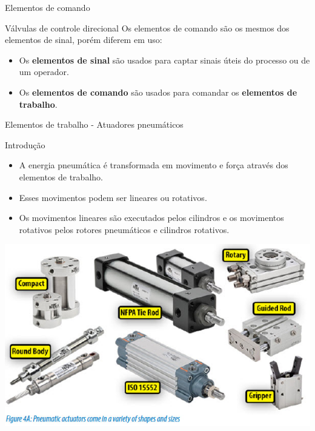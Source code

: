 \begin{frame}{Elementos de comando}
	\begin{block}{Válvulas de controle direcional}
		Os elementos de comando são os mesmos dos elementos de sinal, porém diferem em uso:
		\begin{itemize}
			\item Os \textbf{elementos de sinal} são usados para captar sinais úteis do processo ou de um operador.
			\item Os \textbf{elementos de comando} são usados para comandar os \textbf{elementos de trabalho}.
		\end{itemize}
	\end{block}
\end{frame}


\begin{frame}{Elementos de trabalho - Atuadores pneumáticos}
	\begin{block}{Introdução}
		\begin{itemize}
			\item A energia pneumática é transformada em movimento e força através dos elementos de trabalho.
			\item Esses movimentos podem ser lineares ou rotativos.
			\item Os movimentos lineares são executados pelos cilindros e os movimentos rotativos pelos rotores pneumáticos e cilindros rotativos.
		\end{itemize}
	\end{block}

	\medskip
	
	\centering
	\includegraphics[width=0.6\linewidth]{Figuras/Ch14/fig29}
	
\end{frame}


